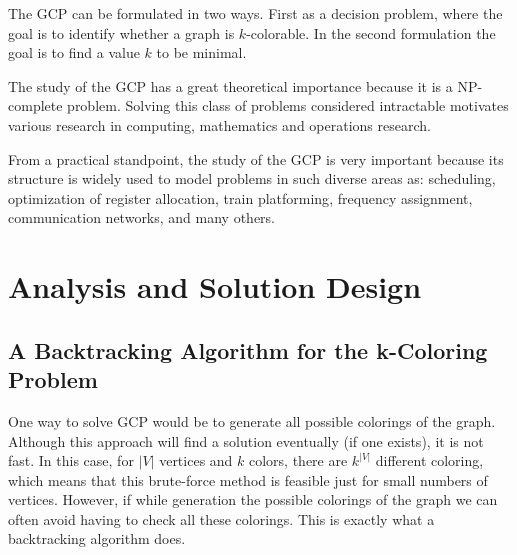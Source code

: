 \documentclass{article}
\begin{document}
The GCP can be formulated in two ways. First as a decision problem, where the goal is to identify whether a graph is $k$-colorable. In the second formulation the goal is to find a value $k$ to be minimal.


The study of the GCP has a great theoretical importance because it is a NP-complete problem\cite{MR519066}. Solving this class of problems considered intractable motivates various research in computing, mathematics and operations research.

From a practical standpoint, the study of the GCP is very important because its structure is widely used to model problems in such diverse areas as: scheduling\cite{Lotfi198627}, optimization of register allocation\cite{Chow}, train platforming\cite{Caprara2007129}, frequency assignment\cite{1623376}, communication networks\cite{120165}, and many others.





\section{Analysis and Solution Design}

\subsection{A Backtracking Algorithm for the k-Coloring Problem}

One way to solve GCP would be to generate all possible colorings of the graph. Although this approach will find a solution eventually (if one exists), it is not fast. In this case, for $|V|$ vertices and $k$ colors, there are $k^{|V|}$ different coloring, which means that this brute-force method is feasible just for small numbers of vertices. However, if while generation the possible colorings of the graph we can often avoid  having to check all these colorings. This is exactly what a backtracking algorithm does. 
\end{document}
